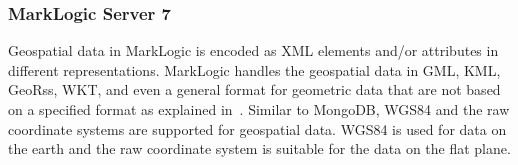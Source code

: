 \documentclass[a4paper,12pt]{article}
\begin{document}

\subsubsection{MarkLogic Server 7}
Geospatial data in MarkLogic is encoded as XML elements and/or attributes in different representations. MarkLogic handles the geospatial data in GML, KML, GeoRss, WKT, and even a general format for geometric data that are not based on a specified format as explained in~\cite{marklogicGeo}. Similar to MongoDB, WGS84 and the raw coordinate systems are supported for geospatial data. WGS84 is used for data on the earth and the raw coordinate system is suitable for the data on the flat plane.
\end{document}
